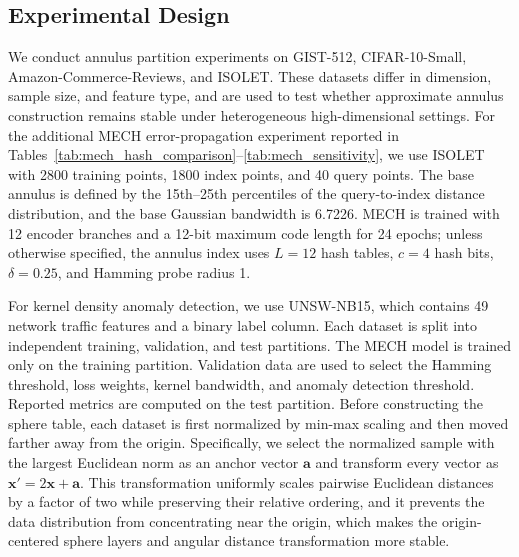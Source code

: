 \documentclass[conference]{IEEEtran}
\begin{document}
\subsection{Experimental Design}
We conduct annulus partition experiments on GIST-512, CIFAR-10-Small, Amazon-Commerce-Reviews, and ISOLET. These datasets differ in dimension, sample size, and feature type, and are used to test whether approximate annulus construction remains stable under heterogeneous high-dimensional settings. For the additional MECH error-propagation experiment reported in Tables~\ref{tab:mech_hash_comparison}--\ref{tab:mech_sensitivity}, we use ISOLET with 2800 training points, 1800 index points, and 40 query points. The base annulus is defined by the 15th--25th percentiles of the query-to-index distance distribution, and the base Gaussian bandwidth is 6.7226. MECH is trained with 12 encoder branches and a 12-bit maximum code length for 24 epochs; unless otherwise specified, the annulus index uses $L=12$ hash tables, $c=4$ hash bits, $\delta=0.25$, and Hamming probe radius 1.

For kernel density anomaly detection, we use UNSW-NB15, which contains 49 network traffic features and a binary label column. Each dataset is split into independent training, validation, and test partitions. The MECH model is trained only on the training partition. Validation data are used to select the Hamming threshold, loss weights, kernel bandwidth, and anomaly detection threshold. Reported metrics are computed on the test partition. Before constructing the sphere table, each dataset is first normalized by min-max scaling and then moved farther away from the origin. Specifically, we select the normalized sample with the largest Euclidean norm as an anchor vector $\mathbf{a}$ and transform every vector as $\mathbf{x}'=2\mathbf{x}+\mathbf{a}$. This transformation uniformly scales pairwise Euclidean distances by a factor of two while preserving their relative ordering, and it prevents the data distribution from concentrating near the origin, which makes the origin-centered sphere layers and angular distance transformation more stable.
\end{document}
